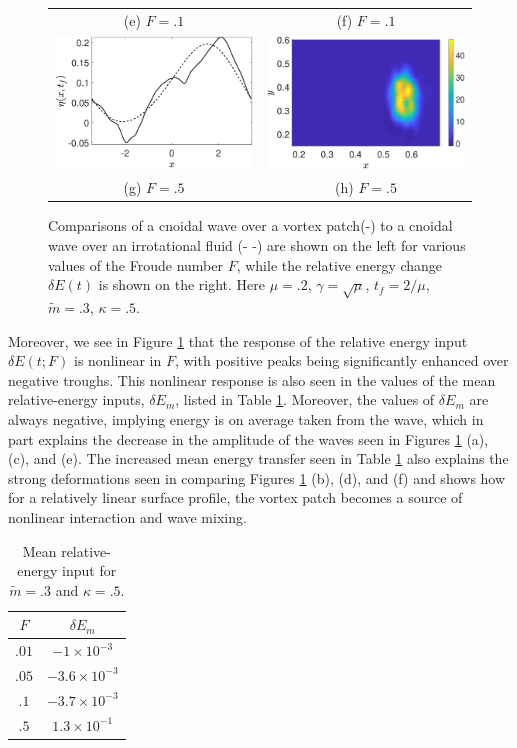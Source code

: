 \documentclass[a4paper,11pt]{article}
\begin{document}
\begin{figure}
\begin{tabular}{cc}
(e)  $F=.1$ & (f)  $F=.1$\\
\includegraphics[width=.35\textwidth]{profiles_wm_50_modu_pt3} & \includegraphics[width=.35\textwidth]{vorticity_wm_50_modu_pt3}\\
(g)  $F=.5$ & (h)  $F=.5$
\end{tabular}
\caption{Comparisons of a cnoidal wave over a vortex patch(-) to a cnoidal wave over an irrotational fluid (- -) are shown on the left for various values of the Froude number $F$, while the relative energy change $\delta E(t)$ is shown on the right.  Here $\mu=.2$, $\gamma=\sqrt{\mu}$, $t_{f}=2/\mu$, $\tilde{m}=.3$, $\kappa = .5$.}
\label{fig:lowsolwave}
\end{figure}

Moreover, we see in Figure \ref{fig:lowsolwave} that the response of the relative energy input $\delta E(t;F)$ is nonlinear in $F$, with positive peaks being significantly enhanced over negative troughs.  This nonlinear response is also seen in the values of the mean relative-energy inputs, $\delta E_{m}$, listed in Table \ref{tab:lowsolmean}.  Moreover, the values of $\delta E_{m}$ are always negative, implying energy is on average taken from the wave, which in part explains the decrease in the amplitude of the waves seen in Figures \ref{fig:lowsolwave} (a), (c), and (e).  The increased mean energy transfer seen in Table \ref{tab:lowsolmean} also explains the strong deformations seen in comparing Figures \ref{fig:lowsolwave} (b), (d), and (f) and shows how for a relatively linear surface profile, the vortex patch becomes a source of nonlinear interaction and wave mixing.    
\begin{table}
\centering
\begin{tabular}{c|c}
$F$ & $\delta E_{m}$ \\
\hline
$.01$ & $-1\times 10^{-3}$\\
$.05$ & $-3.6\times 10^{-3}$\\
$.1$ & $-3.7\times 10^{-3}$\\
$.5$ & $1.3\times 10^{-1}$
\end{tabular}
\caption{Mean relative-energy input for $\tilde{m}=.3$ and $\kappa=.5$.}
\label{tab:lowsolmean}
\end{table}
\end{document}

